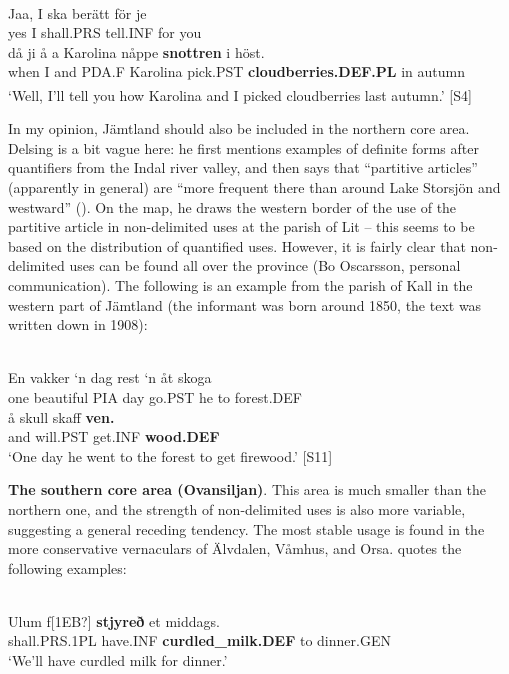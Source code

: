 \ea \label{} 
\\
\gll Jaa,  I  ska  berätt  för  je\\
yes  I  shall.PRS  tell.INF  for  you\\
\gll då  ji  å  a  Karolina  nåppe  \textbf{snottren} i  höst.\\
when  I  and  PDA.F  Karolina  pick.PST  \textbf{cloudberries.DEF.PL} in  autumn\\
\glt ‘Well, I’ll tell you how Karolina and I picked cloudberries last autumn.’\textsuperscript{ }[S4]

\z

In my opinion, Jämtland should also be included in the northern core area. Delsing is a bit vague here: he first mentions examples of definite forms after quantifiers from the Indal river valley, and then says that “partitive articles” (apparently in general) are “more frequent there than around Lake Storsjön and westward” (\citet[19]{Delsing2003a}). On the map, he draws the western border of the use of the partitive article in non-delimited uses at the parish of Lit – this seems to be based on the distribution of quantified uses. However, it is fairly clear that non-delimited uses can be found all over the province (Bo Oscarsson, personal communication). The following is an example from the parish of Kall in the western part of Jämtland (the informant was born around 1850, the text was written down in 1908):

\ea \label{} 
\\
\gll En  vakker  ‘n  dag  rest  ‘n  åt  skoga\\
one  beautiful  PIA  day  go.PST  he  to  forest.DEF\\
\gll å  skull  skaff  \textbf{ven.}\\
and  will.PST  get.INF  \textbf{wood.DEF}\\
\glt ‘One day he went to the forest to get firewood.’ [S11]

\z

\textbf{The southern core area (Ovansiljan)}. This area is much smaller than the northern one, and the strength of non-delimited uses is also more variable, suggesting a general receding tendency. The most stable usage is found in the more conservative vernaculars of Älvdalen, Våmhus, and Orsa. \citet[95]{Levander1909} quotes the following examples:

\ea\label{}
\\
\gll Ulum  f[1EB?]  \textbf{stjyreð} et  middags.  \\
shall.PRS.1PL  have.INF  \textbf{curdled\_milk.DEF} to  dinner.GEN\footnotemark{} \\
\glt ‘We’ll have curdled milk for dinner.’

